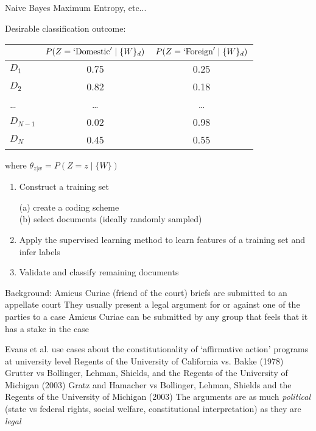 \documentclass{mediumfoils}
\begin{document}
Naive Bayes \hfill Maximum Entropy, etc...


Desirable classification outcome:

\begin{center}
\begin{tabular}{lcc}
      & $P(Z=`\text{Domestic}'\mid \{W\}_d)$ & $P(Z=`\text{Foreign}' \mid \text \{W\}_d)$ \\ \toprule
$D_1$ & 0.75 & 0.25 \\
$D_2$ & 0.82 & 0.18 \\
\ldots & \ldots & \ldots\\
$D_{N-1}$ & 0.02 & 0.98 \\
$D_N$ & 0.45 & 0.55\\ \bottomrule
\end{tabular}
\end{center}

where $\theta_{z|w} = P(Z=z \mid \{W\})$


\begin{enumerate}

\item Construct a training set
 
(a) create a coding scheme\\
(b) select documents (ideally randomly sampled)

\item Apply the supervised learning method to learn features of a training set and infer labels

\item Validate and classify remaining documents

\end{enumerate}


Background:
\ita
\itm Amicus Curiae (friend of the court) briefs are submitted to an appellate court
\itm They usually present a legal argument for or against one of the parties to a case
\itm Amicus Curiae can be submitted by any group that feels that it has a stake in the case
\itz


Evans et al. use cases about the constitutionality of `affirmative action' programs at university level
\ita
\itm Regents of the University of California vs. Bakke (1978)
\itm Grutter vs Bollinger, Lehman, Shields, and the Regents of the University of Michigan (2003)
\itm Gratz and Hamacher vs Bollinger, Lehman, Shields and the Regents of the University of Michigan (2003)
\itz
The arguments are as much \textsl{political} (state vs federal rights, social welfare, constitutional interpretation) as they are \textsl{legal} 
\end{document}
